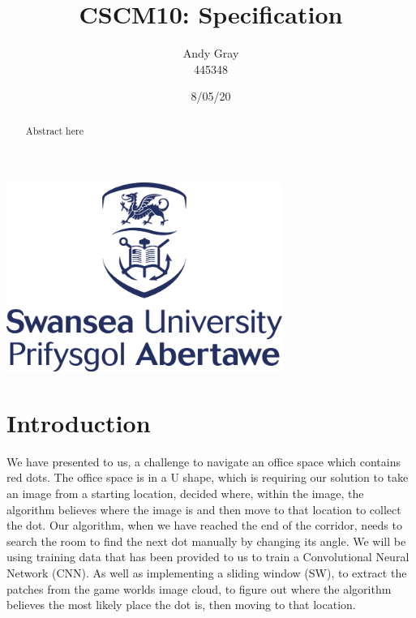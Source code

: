 \documentclass[a4paper,10pt]{article}
\begin{document}
\title{\textbf{CSCM10: Specification}}
\date{8/05/20}
\author{Andy Gray\\445348}




\maketitle
\begin{center}
\item\includegraphics[width=9cm]{swansea.png}
\end{center}

\thispagestyle{empty}
\newpage
{}

\begin{abstract}
	Abstract here 
\end{abstract}

\section{Introduction}

\small 
We have presented to us, a challenge to navigate an office space which contains red dots. The office space is in a U shape, which is requiring our solution to take an image from a starting location, decided where, within the image, the algorithm believes where the image is and then move to that location to collect the dot. Our algorithm, when we have reached the end of the corridor, needs to search the room to find the next dot manually by changing its angle. We will be using training data that has been provided to us to train a Convolutional Neural Network (CNN). As well as implementing a sliding window (SW), to extract the patches from the game worlds image cloud, to figure out where the algorithm believes the most likely place the dot is, then moving to that location.
\end{document}
